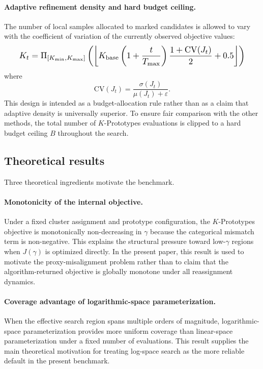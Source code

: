 \documentclass[10pt,lineno]{wlpeerj}
\begin{document}
\paragraph{Adaptive refinement density and hard budget ceiling.}
The number of local samples allocated to marked candidates is allowed to vary with the coefficient of variation of the currently observed objective values:
\[
\resizebox{0.92\columnwidth}{!}{$
\begin{aligned}
K_t = \Pi_{[K_{\min},K_{\max}]}
\left(
\left\lfloor
K_{\mathrm{base}}
\left(1+\frac{t}{T_{\max}}\right)
\frac{1+\mathrm{CV}(J_t)}{2}
+ 0.5
\right\rfloor
\right)
\end{aligned}$}
\]
where
\[
\mathrm{CV}(J_t)=\frac{\sigma(J_t)}{\mu(J_t)+\varepsilon}.
\]
This design is intended as a budget-allocation rule rather than as a claim that adaptive density is universally superior. To ensure fair comparison with the other methods, the total number of $K$-Prototypes evaluations is clipped to a hard budget ceiling $B$ throughout the search.

\subsection*{Theoretical results}

Three theoretical ingredients motivate the benchmark.

\paragraph{Monotonicity of the internal objective.}
Under a fixed cluster assignment and prototype configuration, the $K$-Prototypes objective is monotonically non-decreasing in $\gamma$ because the categorical mismatch term is non-negative. This explains the structural pressure toward low-$\gamma$ regions when $J(\gamma)$ is optimized directly. In the present paper, this result is used to motivate the proxy-misalignment problem rather than to claim that the algorithm-returned objective is globally monotone under all reassignment dynamics.

\paragraph{Coverage advantage of logarithmic-space parameterization.}
When the effective search region spans multiple orders of magnitude, logarithmic-space parameterization provides more uniform coverage than linear-space parameterization under a fixed number of evaluations. This result supplies the main theoretical motivation for treating log-space search as the more reliable default in the present benchmark.
\end{document}
